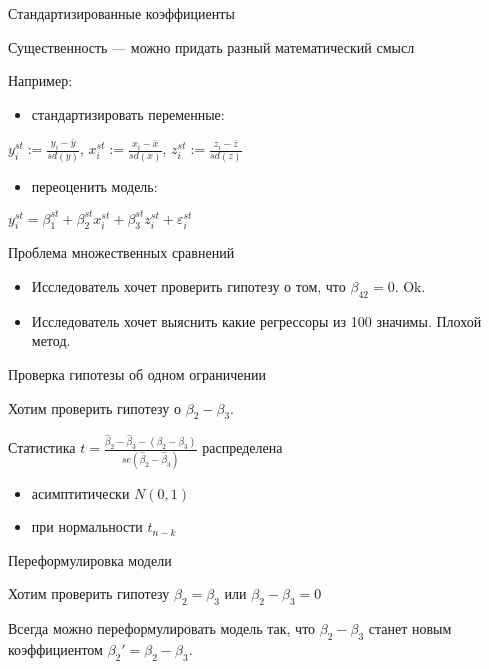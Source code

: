 \documentclass[ignorenonframetext,]{beamer}
\begin{document}
\begin{frame}{Стандартизированные коэффициенты}

Существенность --- можно придать разный математический смысл

Например:

\begin{itemize}
\itemsep1pt\parskip0pt
\item
  стандартизировать переменные:
\end{itemize}

\(y^{st}_i:= \frac{y_i-\bar{y}}{sd(y)}\),
\(x^{st}_i:= \frac{x_i-\bar{x}}{sd(x)}\),
\(z^{st}_i:= \frac{z_i-\bar{z}}{sd(z)}\)

\begin{itemize}
\itemsep1pt\parskip0pt
\item
  переоценить модель:
\end{itemize}

\(y^{st}_i=\beta_1^{st}+\beta_2^{st}x_i^{st}+\beta_3^{st}z_i^{st}+\varepsilon_i^{st}\)

\end{frame}

\begin{frame}{Проблема множественных сравнений}

\begin{itemize}
\item
  Исследователь хочет проверить гипотезу о том, что \(\beta_{42}=0\).
  Ok.
\item
  Исследователь хочет выяснить какие регрессоры из 100 значимы. Плохой
  метод.
\end{itemize}

\end{frame}

\begin{frame}{Проверка гипотезы об одном ограничении}

Хотим проверить гипотезу о \(\beta_2-\beta_3\).

Статистика
\(t=\frac{\hat{\beta}_2-\hat{\beta}_3-(\beta_2-\beta_3)}{se(\hat{\beta}_2-\hat{\beta}_3)}\)
распределена

\begin{itemize}
\item
  асимптитически \(N(0,1)\)
\item
  при нормальности \(t_{n-k}\)
\end{itemize}

\end{frame}

\begin{frame}{Переформулировка модели}

Хотим проверить гипотезу \(\beta_2=\beta_3\) или \(\beta_2-\beta_3=0\)

Всегда можно переформулировать модель так, что \(\beta_2-\beta_3\)
станет новым коэффициентом \(\beta_2'=\beta_2-\beta_3\).

\end{frame}
\end{document}
